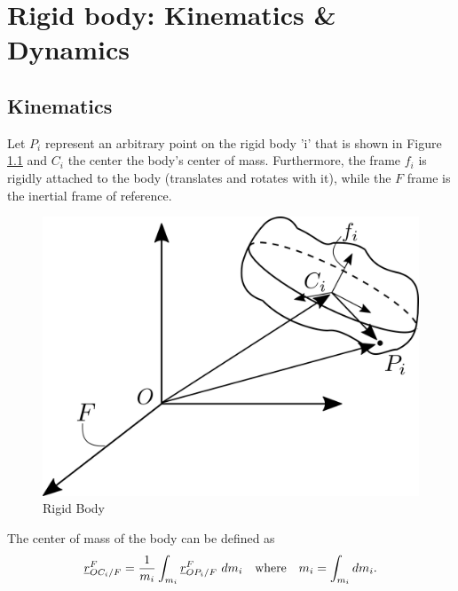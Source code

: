 



\setlength\parindent{0pt}


\clearpage
\setcounter{page}{1}

\chapter{Rigid body: Kinematics \& Dynamics}

\section{Kinematics}

Let $P_{i}$ represent an arbitrary point on the rigid body 'i' that is 
shown in Figure \ref{fig:rigid_body} and $C_{i}$ the center the body's center of 
mass. Furthermore, the frame $f_{i}$ is rigidly attached to the body (translates
and rotates with it), while the $F$ frame is the inertial frame of reference.

\begin{figure}[h]
    \centering\includegraphics[scale=0.2]{Images/rigid_body_diagram.png}
    \caption{Rigid Body}
    \label{fig:rigid_body}
\end{figure}

The center of mass of the body can be defined as
\[
    \pvec{r}{OC_{i}}{F}{F} = \frac{1}{m_{i}}\int_{m_i} \pvec{r}{OP_{i}}{F}{F} \  dm_{i}
    \quad \text{where} \quad m_{i} = \int_{m_i} dm_{i}.
\]

